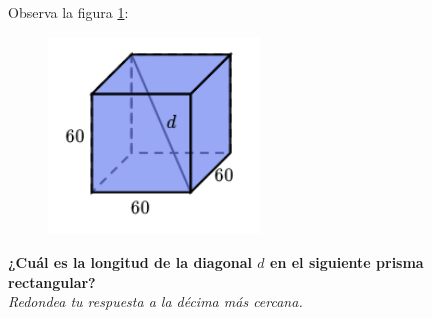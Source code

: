 \question[15]  Observa la figura \ref{fig:pitagoras3D_diag_03}:
\begin{figure}[H]
    \begin{center}
        \includegraphics[width=0.5\textwidth]{../images/pitagoras3D_diag_03.png}
    \end{center}
    \caption{}
    \label{fig:pitagoras3D_diag_03}
\end{figure}
\textbf{¿Cuál es la longitud de la diagonal $d$ en el siguiente prisma rectangular?}\\
\textit{Redondea tu respuesta a la décima más cercana.}